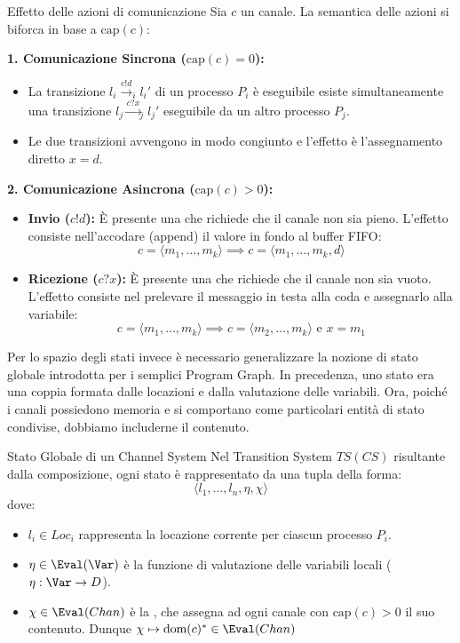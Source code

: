 \begin{definition}{Effetto delle azioni di comunicazione}
  Sia \(c\) un canale. La semantica delle azioni si biforca in base a \(\text{cap}(c)\):

  \textbf{1. Comunicazione Sincrona (\(\text{cap}(c) = 0\)):}
  \begin{itemize}
    \item La transizione \(l_i \xrightarrow{c!d}_i l_i'\) di un processo \(P_i\) è eseguibile  esiste simultaneamente una transizione \(l_j \xrightarrow{c?x}_j l_j'\) eseguibile da un altro processo \(P_j\).
    \item Le due transizioni avvengono in modo congiunto e l'effetto è l'assegnamento diretto \(x = d\).
  \end{itemize}

  \textbf{2. Comunicazione Asincrona (\(\text{cap}(c) > 0\)):}
  \begin{itemize}
    \item \textbf{Invio (\(c!d\)):} È presente una  che richiede che il canale non sia pieno. L'effetto consiste nell'accodare (append) il valore in fondo al buffer FIFO\@:
          \[c = \langle m_1, \dots, m_k \rangle \implies c = \langle m_1, \dots, m_k, d \rangle\]
    \item \textbf{Ricezione (\(c?x\)):} È presente una  che richiede che il canale non sia vuoto. L'effetto consiste nel prelevare il messaggio in testa alla coda e assegnarlo alla variabile:
          \[c = \langle m_1, \dots, m_k \rangle \implies c = \langle m_2, \dots, m_k \rangle \text{ e } x = m_1\]
  \end{itemize}
\end{definition}

Per lo spazio degli stati invece è necessario generalizzare la nozione di stato globale introdotta per i semplici Program Graph. In precedenza, uno stato era una coppia formata dalle locazioni e dalla valutazione delle variabili. Ora, poiché i canali possiedono memoria e si comportano come particolari entità di stato condivise, dobbiamo includerne il contenuto.

\begin{definition}{Stato Globale di un Channel System}
  Nel Transition System \(TS(CS)\) risultante dalla composizione, ogni stato è rappresentato da una tupla della forma:
  \[\langle l_1, \dots, l_n, \eta, \chi \rangle\]
  dove:
  \begin{itemize}
    \item \(l_i \in Loc_i\) rappresenta la locazione corrente per ciascun processo \(P_i\).
    \item \(\eta \in \Eval(\Var)\) è la funzione di valutazione delle variabili locali (\(\eta: \Var \to D\)).
    \item \(\chi \in \Eval(Chan)\) è la , che assegna ad ogni canale con \(\text{cap}(c) > 0\) il suo contenuto. Dunque \(\chi\mapsto\text{dom}(c)^*\in \Eval(Chan)\)
  \end{itemize}
\end{definition}


